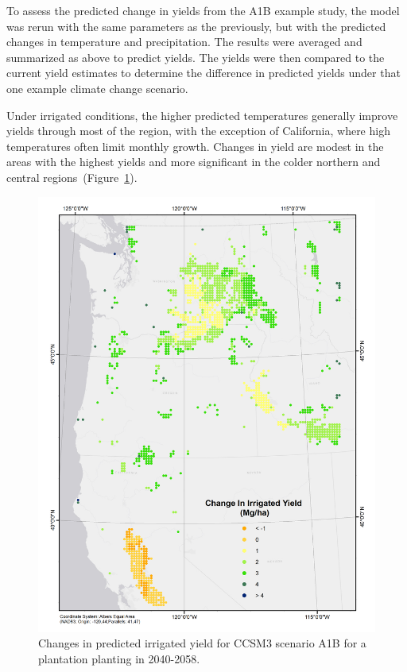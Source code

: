 \documentclass[preprint,12pt]{elsarticle}
\begin{document}
To assess the predicted change in yields from the A1B example study,
the model was rerun with the same parameters as the previously, but
with the predicted changes in temperature and precipitation.  The
results were averaged and summarized as above to predict yields.  The
yields were then compared to the current yield estimates to determine
the difference in predicted yields under that one example climate
change scenario.

Under irrigated conditions, the higher predicted temperatures
generally improve yields through most of the region, with the
exception of California, where high temperatures often limit monthly
growth.  Changes in yield are modest in the areas with the highest
yields and more significant in the colder northern and central
regions~(Figure~\ref{fig:new_irrigated}).
 
\begin{figure}[hp]
  \centering
  \includegraphics[width=1\linewidth]{climate_irrigated}
  \caption{Changes in predicted irrigated yield for \ac{CCSM3} scenario A1B
    for a plantation planting in 2040-2058.}
  \label{fig:new_irrigated}
\end{figure}
\end{document}
